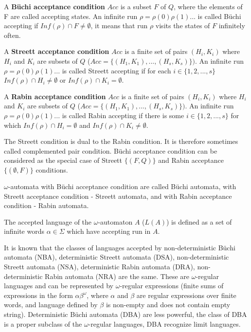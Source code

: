 \documentclass{llncs}
\begin{document}
\begin{definition}
A \textbf{B\"uchi acceptance condition} $Acc$ is a subset $F$ of $Q$, where the elements of F are called accepting states. An infinite run $\rho=\rho(0)\rho(1)...$ is called B\"uchi accepting if $Inf(\rho)\cap F \neq \emptyset$, it means that run $\rho$ visits the states of $F$ infinitely often.
\end{definition}

\begin{definition}
A \textbf{Streett acceptance condition} $Acc$ is a finite set of pairs $(H_i,K_i)$ where $H_i$ and $K_i$ are subsets of $Q$ ($Acc=\{(H_1,K_1),...,(H_s,K_s)\})$. An infinite run $\rho=\rho(0)\rho(1)...$ is called Streett accepting if for each $i \in \{1, 2, ..., s\}$ $Inf(\rho)\cap H_i \neq \emptyset$ or $Inf(\rho)\cap K_i = \emptyset$.
\end{definition}

\begin{definition}
A \textbf{Rabin acceptance condition} $Acc$ is a finite set of pairs $(H_i,K_i)$ where $H_i$ and $K_i$ are subsets of $Q$ ($Acc=\{(H_1,K_1),...,(H_s,K_s)\})$. An infinite run $\rho=\rho(0)\rho(1)...$ is called Rabin accepting if there is some $i \in \{1, 2, ..., s\}$ for which $Inf(\rho)\cap H_i = \emptyset$ and $Inf(\rho)\cap K_i \neq \emptyset$.
\end{definition}

The Streett condition is dual to the Rabin condition. It is therefore sometimes called complemented pair condition. B\"uchi acceptance condition can be considered as the special case of Streett $\{(F, Q)\}$ and Rabin acceptance $\{(\emptyset, F)\}$ conditions. 

$\omega$-automata with B\"uchi acceptance condition are called B\"uchi automata, with Streett acceptance condition - Streett automata, and with Rabin acceptance condition - Rabin automata. 

The accepted language of the $\omega$-automaton $A$ ($L(A)$) is defined as a set of infinite words $\alpha \in \Sigma$ which have accepting run in $A$.

It is known that the classes of languages accepted by non-deterministic B\"uchi automata (NBA), deterministic Streett automata (DSA), non-deterministic Streett automata (NSA), deterministic Rabin automata (DRA), non-deterministic Rabin automata (NRA) are the same. These are $\omega$-regular languages and can be represented by $\omega$-regular expressions (finite sums of expressions in the form $\alpha \beta^{\omega}$, where $\alpha$ and $\beta$ are regular expressions over finite words, and language defined by $\beta$ is non-empty and does not contain empty string). Deterministic B\"uchi automata (DBA) are less powerful, the class of DBA is a proper subclass of the $\omega$-regular languages, DBA recognize limit languages.
\end{document}
